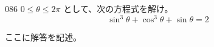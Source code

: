 \begin{prob}{086}{}{}
 $0 \le \theta \le 2\pi$ として、次の方程式を解け。 \\
 \[ \sin^3\theta+\cos^3\theta+\sin\theta=2 \]
\end{prob}
ここに解答を記述。